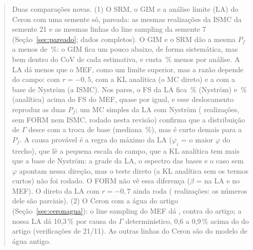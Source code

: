 \documentclass[11pt,a4paper]{article}
\begin{document}
\begin{abstract}
Duas comparações novas. (1) O SRM, o GIM e a análise limite (LA) do Ceron com uma semente só, pareada: as mesmas
realizações da ISMC da semente 21 e as mesmas linhas do line sampling da semente 7 (Seção~\ref{sec:pareado}; dados
completos). O GIM e o SRM dão a mesma $P_f$ a menos de \sgDifAbsMax\,\%: o GIM fica um pouco abaixo, de forma
sistemática, mas bem dentro do CoV de cada estimativa, e custa \sgEcon\,\% menos por análise. A LA dá menos que o MEF,
como um limite superior, mas a razão depende do campo: com $r = -0{,}5$, \lmDirRaRaz{} com a KL analítica (o MC
direto) e \lmIsRazRaMin{} a \lmIsRazRaMax{} com a base de Nyström (a ISMC). Nos pares, o FS da LA fica \lmDesNyRa\,\%
(Nyström) e \lmDesAnRa\,\% (analítica) acima do FS do MEF, quase por igual, e esse deslocamento reproduz as duas
$P_f$; um MC simples da LA com Nyström (\lnyN{} realizações, sem FORM nem ISMC, rodado nesta revisão) confirma que a
distribuição de $\Gamma$ desce com a troca de base (mediana \lnyMed\,\%), mas é curto demais para a $P_f$. A causa
provável é a regra do máximo da LA ($\varphi_i$ = o maior $\varphi$ do trecho), que lê a pequena escala do campo, que a
KL analítica tem mais que a base de Nyström: a grade da LA, o espectro das bases e o caso sem $\varphi$ apontam nessa
direção, mas o teste direto (a KL analítica sem os termos curtos) não foi rodado. O FORM não vê essa diferença
($\beta$ = \lmBetaLaRaMv{} na LA e \lmBetaMefRaMv{} no MEF). O direto da LA com $r = -0{,}7$ ainda roda
(\lmDirRbN{} realizações: os números dele são parciais). (2) O Ceron com a água do artigo (Seção~\ref{sec:ceronagua}): o line sampling do MEF dá \ceaLsPf, contra
\ceaPfArt{} do artigo; a nossa LA dá 10,3\,\% por causa do $\Gamma$ determinístico, 0,6 a 0,9\,\% acima do do artigo
(verificações de 21/11). As outras linhas do Ceron são do modelo de água antigo.
\end{abstract}
\tableofcontents
\end{document}
